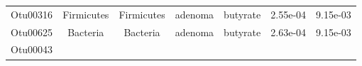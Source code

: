 \documentclass[11pt,]{article}
\begin{document}
\begin{longtable}[]{@{}ccccccc@{}}
\begin{minipage}[t]{0.09\columnwidth}\centering\strut
Otu00316\strut
\end{minipage} & \begin{minipage}[t]{0.17\columnwidth}\centering\strut
Firmicutes\strut
\end{minipage} & \begin{minipage}[t]{0.17\columnwidth}\centering\strut
Firmicutes\strut
\end{minipage} & \begin{minipage}[t]{0.09\columnwidth}\centering\strut
adenoma\strut
\end{minipage} & \begin{minipage}[t]{0.11\columnwidth}\centering\strut
butyrate\strut
\end{minipage} & \begin{minipage}[t]{0.09\columnwidth}\centering\strut
2.55e-04\strut
\end{minipage} & \begin{minipage}[t]{0.09\columnwidth}\centering\strut
9.15e-03\strut
\end{minipage}\tabularnewline
\begin{minipage}[t]{0.09\columnwidth}\centering\strut
Otu00625\strut
\end{minipage} & \begin{minipage}[t]{0.17\columnwidth}\centering\strut
Bacteria\strut
\end{minipage} & \begin{minipage}[t]{0.17\columnwidth}\centering\strut
Bacteria\strut
\end{minipage} & \begin{minipage}[t]{0.09\columnwidth}\centering\strut
adenoma\strut
\end{minipage} & \begin{minipage}[t]{0.11\columnwidth}\centering\strut
butyrate\strut
\end{minipage} & \begin{minipage}[t]{0.09\columnwidth}\centering\strut
2.63e-04\strut
\end{minipage} & \begin{minipage}[t]{0.09\columnwidth}\centering\strut
9.15e-03\strut
\end{minipage}\tabularnewline
\begin{minipage}[t]{0.09\columnwidth}\centering\strut
Otu00043\strut
\end{minipage} & \begin{minipage}[t]{0.17\columnwidth}\centering\strut

\end{minipage}
\end{longtable}
\end{document}
